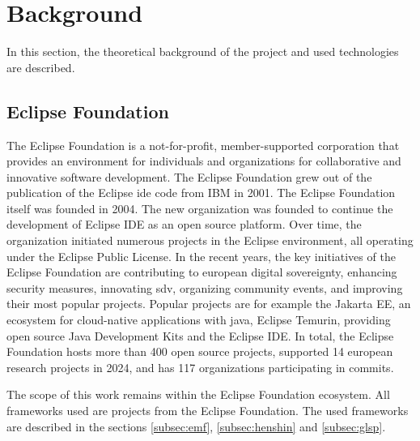 \section{Background}
\label{sec:background}
  In this section, the theoretical background of the project and used technologies are described. 

  \subsection{Eclipse Foundation}
  \label{subsec:eclipse-foundation}
  The Eclipse Foundation is a not-for-profit, member-supported corporation that provides an environment for individuals and organizations for collaborative and innovative software development. \cite{eclipse-review} The Eclipse Foundation grew out of the publication of the Eclipse \ac{ide} code from IBM in 2001. The Eclipse Foundation itself was founded in 2004. The new organization was founded to continue the development of Eclipse IDE as an open source platform. Over time, the organization initiated numerous projects in the Eclipse environment, all operating under the Eclipse Public License. \cite{heise-eclipse-foundation,eclipse-review} In the recent years, the key initiatives of the Eclipse Foundation are contributing to european digital sovereignty, enhancing security measures, innovating \ac{sdv}, organizing community events, and improving their most popular projects. Popular projects are for example the Jakarta EE, an ecosystem for cloud-native applications with java, Eclipse Temurin, providing open source Java Development Kits and the Eclipse IDE. \cite{eclipse-report} In total, the Eclipse Foundation hosts more than 400 open source projects, supported 14 european research projects in 2024, and has 117 organizations participating in commits. \cite{eclipse-report}

  The scope of this work remains within the Eclipse Foundation ecosystem. All frameworks used are projects from the Eclipse Foundation. The used frameworks are described in the sections \ref{subsec:emf}, \ref{subsec:henshin} and \ref{subsec:glsp}.

